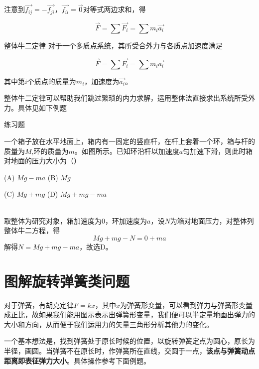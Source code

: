 注意到$\vec{f_{ij}} = - \vec{f_{ji}}$，$\vec{f_{ii}}=\vec{0}$对等式两边求和，得

$$\vec{F} = \sum \vec{F_i} = \sum m_i \vec{a_i}$$

\begin{theo}{整体牛二定律}{}
对于一个多质点系统，其所受合外力与各质点加速度满足

$$\vec{F} = \sum \vec{F_i} = \sum m_i \vec{a_i}$$

其中第$i$个质点的质量为$m_i$，加速度为$\vec{a_i}$。
\end{theo}

整体牛二定律可以帮助我们跳过繁琐的内力求解，运用整体法直接求出系统所受外力。具体见如下例题

\begin{ep}{练习题}{}
\begin{minipage}[b]{0.6\linewidth}
一个箱子放在水平地面上，箱内有一固定的竖直杆，在杆上套着一个环，箱与杆的质量为$M$,环的质量为$m$。如图所示。已知环沿杆以加速度$a$匀加速下滑，则此时箱对地面的压力大小为（）

(A) $Mg-ma$ \quad (B) $Mg$

(C) $Mg+mg$ \quad (D) $Mg+mg-ma$
\end{minipage}
\hfill
\begin{minipage}[b]{0.3\linewidth}

\end{minipage}
~\\

取整体为研究对象，箱加速度为$0$，环加速度为$a$，设$N$为箱对地面压力，对整体列整体牛二方程，得
$$Mg+mg-N=0 + ma$$
解得$N=Mg+mg-ma$，故选D。
\end{ep}

\section{图解旋转弹簧类问题}

对于弹簧，有胡克定律$F=kx$，其中$x$为弹簧形变量，可以看到弹力与弹簧形变量成正比，故如果我们能用图示表示出弹簧形变量，我们便可以半定量地画出弹力的大小和方向，从而便于我们运用力的矢量三角形分析其他力的变化。

一个基本想法是，找到弹簧处于原长时候的位置，以旋转弹簧定点为圆心，原长为半径，画圆。当弹簧不在原长时，作弹簧所在直线，交圆于一点，\textbf{该点与弹簧动点距离即表征弹力大小}。具体操作参考下面例题。

